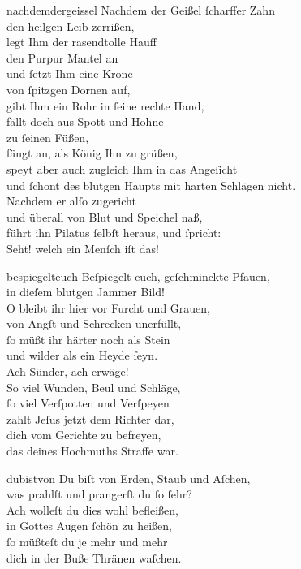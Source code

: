 \documentclass[tocstyle=ref-genre]{ees}
\begin{document}
{\begin{movement}{nachdemdergeissel}
  Nachdem der Geißel ſcharffer Zahn\\
  den heilgen Leib zerrißen,\\
  legt Ihm der rasendtolle Hauff\\
  den Purpur Mantel an\\
  und ſetzt Ihm eine Krone\\
  von ſpitzgen Dornen auf,\\
  gibt Ihm ein Rohr in ſeine rechte Hand,\\
  fällt doch aus Spott und Hohne\\
  zu ſeinen Füßen,\\
  fängt an, als König Ihn zu grüßen,\\
  speyt aber auch zugleich Ihm in das Angeſicht\\
  und ſchont des blutgen Haupts mit harten Schlägen nicht.\\
  Nachdem er alſo zugericht\\
  und überall von Blut und Speichel naß,\\
  führt ihn Pilatus ſelbſt heraus, und ſpricht:\\
  Seht! welch ein Menſch iſt das!
\end{movement}

\begin{movement}{bespiegelteuch}
  Beſpiegelt euch, geſchminckte Pfauen,\\
  in dieſem blutgen Jammer Bild!\\
  O bleibt ihr hier vor Furcht und Grauen,\\
  von Angſt und Schrecken unerfüllt,\\
  ſo müßt ihr härter noch als Stein\\
  und wilder als ein Heyde ſeyn.\\
  Ach Sünder, ach erwäge!\\
  So viel Wunden, Beul und Schläge,\\
  ſo viel Verſpotten und Verſpeyen\\
  zahlt Jeſus jetzt dem Richter dar,\\
  dich vom Gerichte zu befreyen,\\
  das deines Hochmuths Straffe war.
\end{movement}

\begin{movement}{dubistvon}
  Du biſt von Erden, Staub und Aſchen,\\
  was prahlſt und prangerſt du ſo ſehr?\\
  Ach wolleſt du dies wohl befleißen,\\
  in Gottes Augen ſchön zu heißen,\\
  ſo müßteſt du je mehr und mehr\\
  dich in der Buße Thränen waſchen.
\end{movement}

}
\end{document}
